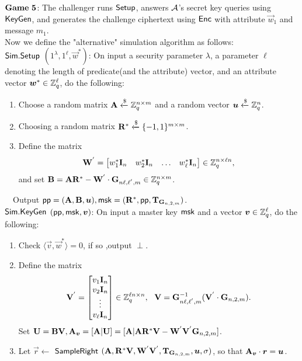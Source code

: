 $\mathbf{Game\ 5}$: The challenger runs $\mathsf{Setup}$, answers $\mathcal{A}$'s secret key queries using $\mathsf{KeyGen}$, and generates the challenge ciphertext using $\mathsf{Enc}$ with attribute $\vec{w}_{1}$ and message $m_{1}$.\\[0.2cm]
Now we define the "alternative" simulation algorithm as follows:\\[0.4cm]
$\mathsf{Sim}.\mathsf{Setup}$ $(1^{\lambda},1^{\ell},\vec{w}^{*})$: On input a security parameter $\lambda$, a parameter $\ell$ denoting the length of predicate(and the attribute) vector, and an attribute vector $\boldsymbol{w}^{*} \in \mathbb{Z}^{\ell}_{q}$, do the following:
\begin{enumerate}
\item Choose a random matrix $\mathbf{A} \xleftarrow {\$} \mathbb{Z}^{n \times m}_{q}$ and a random vector $\boldsymbol{u} \xleftarrow {\$} \mathbb{Z}^{n}_{q}$.\\
\item Choosing a random matrix $\mathbf{R}^{*} \xleftarrow {\$} \{-1,1\}^{m \times m}$.\\
\item Define the matrix
\begin{equation}
\mathbf{W}^{'}= \begin{bmatrix}
w^{*}_{1} \mathbf{I}_{n}&w^{*}_{2} \mathbf{I}_{n}&\ldots&w^{*}_{\ell} \mathbf{I}_{n}
\end{bmatrix} \in \mathbb{Z}^{n \times \ell n}_{q},
\end{equation}
and set $\mathbf{B}=\mathbf{A}\mathbf{R}^{*}-\mathbf{W}^{'}\cdot \mathbf{G}_{n\ell,\ell^{'},m} \in \mathbb{Z}^{n \times m}_{q}$.
\end{enumerate}
~~Output $\mathsf{pp}=(\mathbf{A}, \mathbf{B}, \boldsymbol{u}),\mathsf{msk}=(\mathbf{R}^{*}, \mathsf{pp}, \mathbf{T}_{\mathbf{G}_{n,2,m}})$.\\[0.4cm]
$\mathsf{Sim}.\mathsf{KeyGen}$ $(\mathsf{pp}, \mathsf{msk}, \boldsymbol{v})$: On input a master key $\mathsf{msk}$ and a vector $\boldsymbol{v} \in \mathbb{Z}^{\ell}_{q}$, do the following:
\begin{enumerate}
\item Check $\langle \vec{v}, \vec{w}^{*} \rangle =0$, if so ,output $\perp$.\\
\item Define the matrix
\begin{equation}
\mathbf{V}^{'}= \begin{bmatrix}
v_{1} \mathbf{I}_{n}\\
v_{2} \mathbf{I}_{n}\\
\vdots\\
v_{\ell} \mathbf{I}_{n}
\end{bmatrix} \in \mathbb{Z}^{\ell n \times n}_{q},~~ \mathbf{V}=\mathbf{G}^{-1}_{n\ell,\ell^{'},m}(\mathbf{V}^{'} \cdot \mathbf{G}_{n,2,m}).
\end{equation}
Set $\mathbf{U}=\mathbf{BV}, \mathbf{A}_{\boldsymbol{v}}=[\mathbf{A}|\mathbf{U}]=[\mathbf{A}|\mathbf{A}\mathbf{R}^{*}\mathbf{V}-\mathbf{W}^{'}\mathbf{V}^{'}\mathbf{G}_{n,2,m}]$.\\
\item Let $\vec{r}\leftarrow$ $\mathsf{SampleRight}$ $(\mathbf{A},\mathbf{R}^{*}\mathbf{V}, \mathbf{W}^{'}\mathbf{V}^{'}, \mathbf{T}_{\mathbf{G}_{n,2,m}}, \boldsymbol{u}, \sigma)$, so that $\mathbf{A}_{\boldsymbol{v}}\cdot \boldsymbol{r}=\boldsymbol{u}$.
\end{enumerate}
